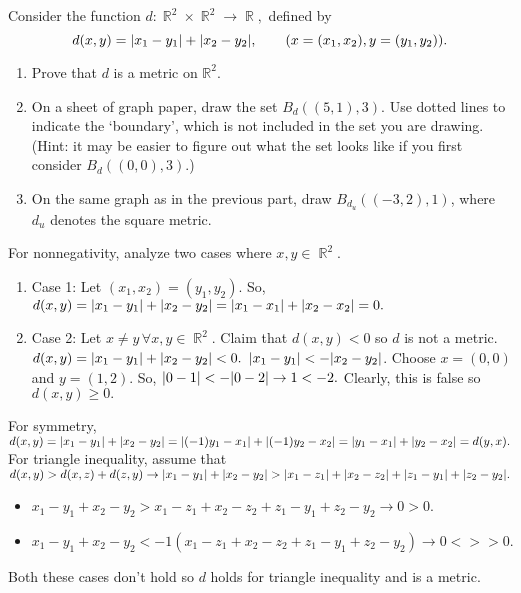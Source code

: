 \documentclass[12pt,letterpaper,boxed]{hmcpset}
\DeclarePairedDelimiter\abs{\lvert}{\rvert}
\DeclareMathOperator{\R}{\mathbb{R}}
\begin{document}
\begin{problem}[Exercise 2.6.]
Consider the function $d: \R^{2} \times \R^{2} \rightarrow \R,$ defined by $$d(x, y) = \abs{x_1 - y_1} + \abs{x_2 - y_2}, \quad \quad (x = (x_1, x_2), y = (y_1, y_2)). $$
\vspace{-2mm}
\begin{enumerate}
	\itemsep0em
	\item Prove that $d$ is a metric on $\mathbb{R}^{2}.$
	\item On a sheet of graph paper, draw the set $B_{d}((5, 1), 3).$ Use dotted lines to indicate the ‘boundary’,
which is not included in the set you are drawing. (Hint: it may be easier to figure out what the
set looks like if you first consider $B_{d}((0, 0), 3).$)
	\item On the same graph as in the previous part, draw $B_{d_{u}}((-3, 2),1)$, where $d_{u}$ denotes the square metric.
\end{enumerate}
\end{problem}
\begin{solution}
For nonnegativity, analyze two cases where $x, y \in \R^{2}$.
\begin{enumerate}
	\itemsep0em
	\item Case 1: Let  $(x_1, x_2) = (y_1, y_2)$. So, $d(x, y) = \abs{x_1 - y_1} + \abs{x_2 - y_2} = \abs{x_1 - x_1} + \abs{x_2 - x_2} = 0.$ 
	\item Case 2: Let $x \neq y \, \forall x, y \in \R^{2}.$ Claim that $d(x, y) < 0$ so $d$ is not a metric. $d(x, y) = \abs{x_1 - y_1} + \abs{x_2 - y_2} < 0.$ $\abs{x_1 - y_1} < -\abs{x_2 - y_2}$. Choose $x = (0, 0)$ and $y = (1, 2)$. So, $\abs{0 - 1} < -\abs{0 - 2} \rightarrow 1 < -2.$ Clearly, this is false so $d(x,y) \ge 0.$ 
\end{enumerate}

For symmetry, $d(x, y) = \abs{x_1 - y_1} + \abs{x_2 - y_2} = \abs{(-1)y_1 - x_1} + \abs{(-1)y_2 - x_2} = \abs{y_1 - x_1} + \abs{y_2 - x_2} = d(y,x).$ \\
For triangle inequality, assume that $d(x, y) > d(x,z) + d(z,y) \rightarrow \abs{x_1 - y_1} + \abs{x_2 - y_2} > \abs{x_1 - z_1} + \abs{x_2 - z_2} + \abs{z_1 - y_1} + \abs{z_2 - y_2}.$
\vspace{-2mm}
\begin{itemize}
	\itemsep0em
	\item $x_1 - y_1 + x_2 - y_2 > x_1 - z_1 + x_2 - z_2 + z_1 - y_1 + z_2 - y_2 \rightarrow 0 > 0.$
	\item $x_1 - y_1 + x_2 - y_2 < -1(x_1 - z_1 + x_2 - z_2 + z_1 - y_1 + z_2 - y_2) \rightarrow 0 <>> 0.$
\end{itemize}
Both these cases don't hold so $d$ holds for triangle inequality and is a metric.
\end{solution}
\end{document}
